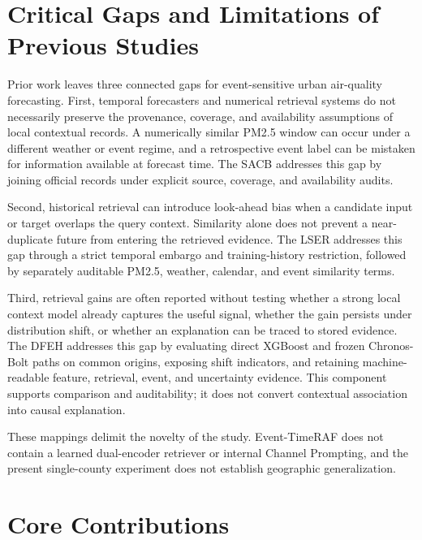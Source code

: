 \section{Critical Gaps and Limitations of Previous Studies}

Prior work leaves three connected gaps for event-sensitive urban air-quality
forecasting. First, temporal forecasters and numerical retrieval systems do not
necessarily preserve the provenance, coverage, and availability assumptions of
local contextual records. A numerically similar PM2.5 window can occur under a
different weather or event regime, and a retrospective event label can be
mistaken for information available at forecast time. The SACB addresses this
gap by joining official records under explicit source, coverage, and
availability audits.

Second, historical retrieval can introduce look-ahead bias when a candidate
input or target overlaps the query context. Similarity alone does not prevent a
near-duplicate future from entering the retrieved evidence. The LSER addresses
this gap through a strict temporal embargo and training-history restriction,
followed by separately auditable PM2.5, weather, calendar, and event similarity
terms.

Third, retrieval gains are often reported without testing whether a strong local
context model already captures the useful signal, whether the gain persists
under distribution shift, or whether an explanation can be traced to stored
evidence. The DFEH addresses this gap by evaluating direct XGBoost and frozen
Chronos-Bolt paths on common origins, exposing shift indicators, and retaining
machine-readable feature, retrieval, event, and uncertainty evidence. This
component supports comparison and auditability; it does not convert contextual
association into causal explanation.

These mappings delimit the novelty of the study. Event-TimeRAF does not contain
a learned dual-encoder retriever or internal Channel Prompting, and the present
single-county experiment does not establish geographic generalization.

\section{Core Contributions}

